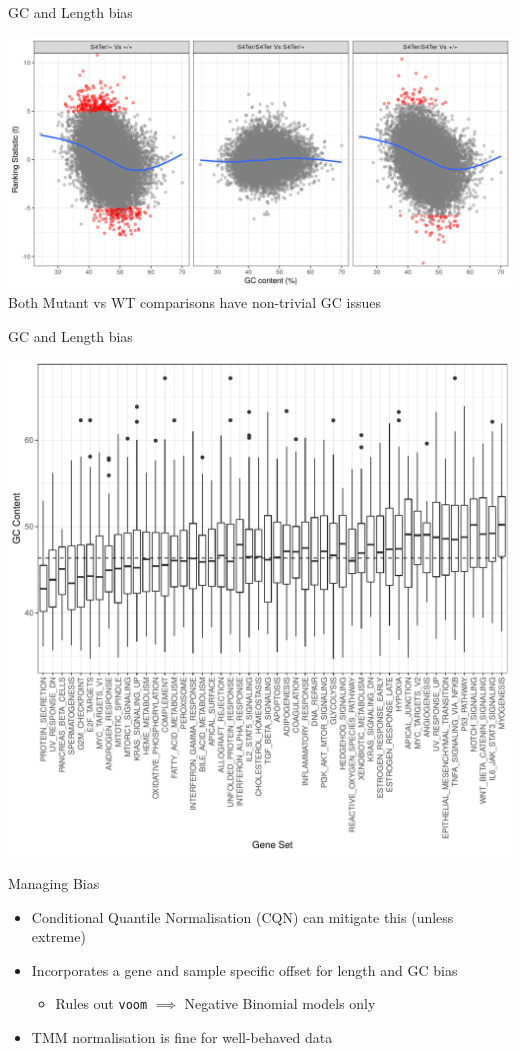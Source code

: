\documentclass[11pt]{beamer}
\begin{document}
\begin{frame}{GC and Length bias}

	\center
	\includegraphics[width=0.9\linewidth]{figures/voomGCBias-1.png} \\
	Both Mutant vs WT comparisons have non-trivial GC issues\\[1cm]
	
\end{frame}

\begin{frame}{GC and Length bias}	

	\center
	\includegraphics[width=0.65\linewidth]{figures/GeneSetGC.pdf} 

\end{frame}

\begin{frame}{Managing Bias}

	\begin{itemize}
		\item Conditional Quantile Normalisation (CQN) can mitigate this (unless extreme)
		\item Incorporates a gene and sample specific offset for length and GC bias
		\begin{itemize}
			\item Rules out \texttt{voom} $\implies$ Negative Binomial models only
		\end{itemize}
		\item TMM normalisation is fine for well-behaved data
	\end{itemize}

\end{frame}
\end{document}
